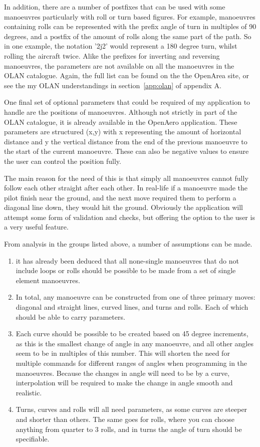In addition, there are a number of postfixes that can be used with some manoeuvres particularly with roll or turn based figures. For example, manoeuvres containing rolls can be represented with the prefix angle of turn in multiples of 90 degrees, and a postfix of the amount of rolls along the same part of the path. So in one example, the notation '2j2' would represent a 180 degree turn, whilst rolling the aircraft twice. Alike the prefixes for inverting and reversing manoeuvres, the parameters are not available on all the manoeuvres in the OLAN catalogue. Again, the full list can be found on the the OpenArea site, or see the my OLAN understandings in section~\ref{app:olan} of appendix A.

One final set of optional parameters that could be required of my application to handle are the positions of manoeuvres. Although not strictly in part of the OLAN catalogue, it is already available in the OpenAero application. These parameters are structured (x,y) with x representing the amount of horizontal distance and y the vertical distance from the end of the previous manoeuvre to the start of the current manoeuvre. These can also be negative values to ensure the user can control the position fully. 

The main reason for the need of this is that simply all manoeuvres cannot fully follow each other straight after each other. In real-life if a manoeuvre made the pilot finish near the ground, and the next move required them to perform a diagonal line down, they would hit the ground. Obviously the application will attempt some form of validation and checks, but offering the option to the user is a very useful feature.

From analysis in the groups listed above, a number of assumptions can be made.
\begin{enumerate}
	\item it has already been deduced that all none-single manoeuvres that do not include loops or rolls should be possible to be made from a set of single element manoeuvres.
	\item In total, any manoeuvre can be constructed from one of three primary moves: diagonal and straight lines, curved lines, and turns and rolls. Each of which should be able to carry parameters.
	\item Each curve should be possible to be created based on 45 degree increments, as this is the smallest change of angle in any manoeuvre, and all other angles seem to be in multiples of this number. This will shorten the need for multiple commands for different ranges of angles when programming in the manoeuvres. Because the changes in angle will need to be by a curve, interpolation will be required to make the change in angle smooth and realistic.
	\item Turns, curves and rolls will all need parameters, as some curves are steeper and shorter than others. The same goes for rolls, where you can choose anything from quarter to 3 rolls, and in turns the angle of turn should be specifiable.
\end{enumerate}

